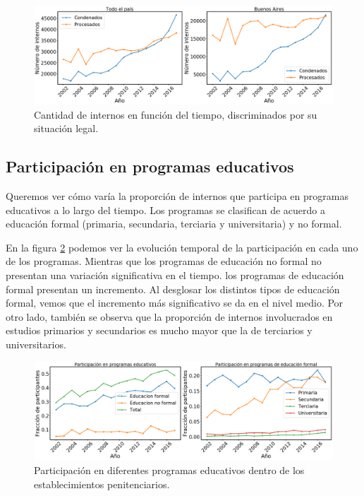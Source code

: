 \documentclass[10pt]{article}
\begin{document}
\begin{figure}[H]
	\centering
	\includegraphics[scale=0.26]{graficos/situacion_legal.png}
	\caption{Cantidad de internos en funci\'on del tiempo, discriminados por su situaci\'on legal. \label{fig:situacion_legal}}
\end{figure}


\subsection{Participación en programas educativos}

Queremos ver cómo varía la proporción de internos que participa en programas educativos a lo largo del tiempo. Los programas se clasifican de acuerdo a educaci\'on formal (primaria, secundaria, terciaria y universitaria) y no formal.

En la figura \ref{fig:educativos} podemos ver la evoluci\'on temporal de la participaci\'on en cada uno de los programas. Mientras que los programas de educaci\'on no formal no presentan una variaci\'on significativa en el tiempo. los programas de educaci\'on formal presentan un incremento. Al desglosar los distintos tipos de educaci\'on formal, vemos que el incremento m\'as significativo se da en el nivel medio. Por otro lado, también se observa que la proporción de internos involucrados en estudios primarios y secundarios es mucho mayor que la de terciarios y universitarios.

\begin{figure}[H]
	\centering
	\includegraphics[scale=0.26]{graficos/participacion_educativos.png}
	\caption{Participaci\'on en diferentes programas educativos dentro de los establecimientos penitenciarios.\label{fig:educativos}}
\end{figure}
\end{document}
